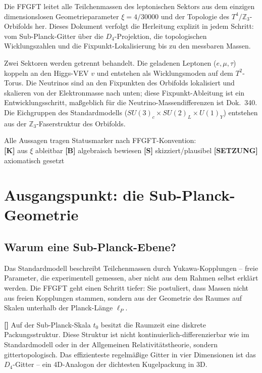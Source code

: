 Die FFGFT leitet alle Teilchenmassen des leptonischen Sektors aus dem
einzigen dimensionslosen Geometrieparameter $\xi = 4/30000$ und der
Topologie des $T^4/\mathbb{Z}_3$-Orbifolds her. Dieses Dokument
verfolgt die Herleitung explizit in jedem Schritt: vom Sub-Planck-Gitter
über die $D_4$-Projektion, die topologischen Wicklungszahlen und die
Fixpunkt-Lokalisierung bis zu den messbaren Massen.

Zwei Sektoren werden getrennt behandelt. Die geladenen Leptonen
($e, \mu, \tau$) koppeln an den Higgs-VEV $v$ und entstehen als
Wicklungsmoden auf dem $T^2$-Torus. Die Neutrinos sind an den
Fixpunkten des Orbifolds lokalisiert und skalieren von der Elektronmasse
nach unten; diese Fixpunkt-Ableitung ist ein Entwicklungsschritt,
maßgeblich für die Neutrino-Massendifferenzen ist Dok.~340. Die Eichgruppen des Standardmodells
($SU(3)_c \times SU(2)_L \times U(1)_Y$) entstehen aus der
$\mathbb{Z}_3$-Faserstruktur des Orbifolds.

\begin{keyresult}[Statusmarkierung]
Alle Aussagen tragen Statusmarker nach FFGFT-Konvention:\\
\textbf{[K]} aus $\xi$ ableitbar \quad
\textbf{[B]} algebraisch bewiesen \quad
\textbf{[S]} skizziert/plausibel \quad
\textbf{[SETZUNG]} axiomatisch gesetzt
\end{keyresult}

\section{Ausgangspunkt: die Sub-Planck-Geometrie}

\subsection{Warum eine Sub-Planck-Ebene?}

Das Standardmodell beschreibt Teilchenmassen durch Yukawa-Kopplungen
-- freie Parameter, die experimentell gemessen, aber nicht aus dem
Rahmen selbst erklärt werden. Die FFGFT geht einen Schritt tiefer:
Sie postuliert, dass Massen nicht aus freien Kopplungen stammen,
sondern aus der Geometrie des Raumes auf Skalen unterhalb der
Planck-Länge $\ell_P$.

\textbf{[]} Auf der Sub-Planck-Skala $t_0$ besitzt die
Raumzeit eine diskrete Packungsstruktur. Diese Struktur ist nicht
kontinuierlich-differenzierbar wie im Standardmodell oder in der
Allgemeinen Relativitätstheorie, sondern gittertopologisch. Das
effizienteste regelmäßige Gitter in vier Dimensionen ist das
$D_4$-Gitter -- ein 4D-Analogon der dichtesten Kugelpackung in 3D.

